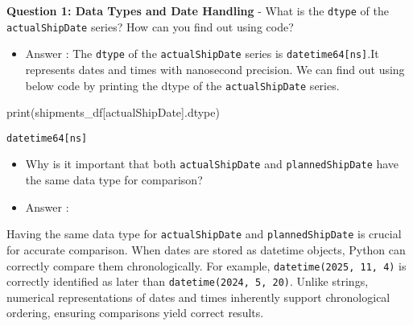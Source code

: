 \documentclass[
  letterpaper,
  DIV=11,
  numbers=noendperiod]{scrartcl}
\newenvironment{Shaded}{\begin{snugshade}}{\end{snugshade}}
\newcommand{\BuiltInTok}[1]{\textcolor[rgb]{0.00,0.23,0.31}{#1}}
\newcommand{\NormalTok}[1]{\textcolor[rgb]{0.00,0.23,0.31}{#1}}
\newcommand{\StringTok}[1]{\textcolor[rgb]{0.13,0.47,0.30}{#1}}
\providecommand{\tightlist}{%
  \setlength{\itemsep}{0pt}\setlength{\parskip}{0pt}}
\begin{document}
\begin{tcolorbox}[enhanced jigsaw, colframe=quarto-callout-important-color-frame, title=\textcolor{quarto-callout-important-color}{\faExclamation}\hspace{0.5em}{🤔 Discussion Questions: Assign Mental Model}, breakable, opacityback=0, arc=.35mm, leftrule=.75mm, titlerule=0mm, left=2mm, toptitle=1mm, rightrule=.15mm, bottomtitle=1mm, bottomrule=.15mm, opacitybacktitle=0.6, toprule=.15mm, colback=white, coltitle=black, colbacktitle=quarto-callout-important-color!10!white]

\textbf{Question 1: Data Types and Date Handling} - What is the
\texttt{dtype} of the \texttt{actualShipDate} series? How can you find
out using code?

\begin{itemize}
\tightlist
\item
  Answer : The \texttt{dtype} of the \texttt{actualShipDate} series is
  \texttt{datetime64{[}ns{]}}.It represents dates and times with
  nanosecond precision. We can find out using below code by printing the
  dtype of the \texttt{actualShipDate} series.
\end{itemize}

\begin{Shaded}
\begin{Highlighting}[]
\BuiltInTok{print}\NormalTok{(shipments\_df[}\StringTok{\textquotesingle{}actualShipDate\textquotesingle{}}\NormalTok{].dtype)}
\end{Highlighting}
\end{Shaded}

\begin{verbatim}
datetime64[ns]
\end{verbatim}

\begin{itemize}
\item
  Why is it important that both \texttt{actualShipDate} and
  \texttt{plannedShipDate} have the same data type for comparison?
\item
  Answer :
\end{itemize}

Having the same data type for \texttt{actualShipDate} and
\texttt{plannedShipDate} is crucial for accurate comparison. When dates
are stored as datetime objects, Python can correctly compare them
chronologically. For example, \texttt{datetime(2025,\ 11,\ 4)} is
correctly identified as later than \texttt{datetime(2024,\ 5,\ 20)}.
Unlike strings, numerical representations of dates and times inherently
support chronological ordering, ensuring comparisons yield correct
results.


\end{tcolorbox}
\end{document}
